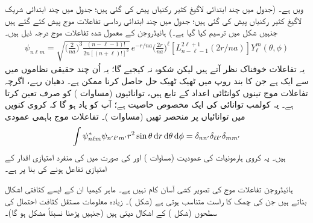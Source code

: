   ویں  ہے۔ (جدول  میں چند ابتدائی لاگیغ  کثیر رکنیاں  پیش کی گئی ہیں؛ جدول  میں چند ابتدائی شریک لاگیغ  کثیر رکنیاں پیش کی  گئی ہیں؛  جدول  میں چند ابتدائی رداسی تفاعلات موج پیش کئے گئے ہیں جنہیں شکل    میں ترسیم کیا گیا ہے۔) ہائیڈروجن کے معمول شدہ تفاعلات موج درجہ ذیل ہیں۔
  \begin{align}\label{مساوات_تین_ابعادی_ہائیڈروجن_تفاعلات_موج}
\psi_{n\ell m}=\sqrt{\big(\frac{2}{na}\big)^3\frac{(n-\ell-1)!}{2n[(n+\ell)!]^{3}}}\,e^{-r/na}\big(\frac{2r}{na}\big)^{\ell}[L_{n-\ell-1}^{2\ell+1}(2r/na)]Y_{\ell}^{m}(\theta,\phi)
\end{align}
یہ تفاعلات خوفناک نظر آتے ہیں لیکن شکوہ  نہ کیجیے گا؛ یہ اُن چند حقیقی نظاموں میں سے ایک ہے جن کا  بند روپ میں ٹھیک ٹھیک حل حاصل کرنا ممکن ہے۔  دھیان رہے، اگرچہ تفاعلات موج تینوں کوانٹائی اعداد کے تابع ہیں، توانائیوں (مساوات ) کو صرف  تعین کرتا ہے۔ یہ کولمب توانائی کی ایک مخصوص خاصیت ہے؛ آپ کو یاد ہو گا کہ کروی کنویں  میں توانائیاں  پر منحصر تھیں (مساوات )۔ تفاعلات موج باہمی عمودی 
\begin{align}
\int\psi_{n\ell m}^{*}\psi_{n'\ell'm'}r^{2}\sin\theta\dif r\dif\theta\dif\phi=\delta_{nn'}\delta_{\ell \ell'}\delta_{mm'} 
\end{align}
ہیں۔ یہ کروی ہارمونیات کی عمودیت (مساوات )  اور  کی صورت میں   کی منفرد امتیازی  اقدار کے امتیازی تفاعل ہونے کی بنا پر ہے۔

ہائیڈروجن تفاعلات موج کی تصویر کشی آسان کام نہیں ہے۔  ماہر کیمیا ان کے ایسے کثافتی اشکال بناتے ہیں جن کی چمک    کا راست متناسب ہوتی ہے (شکل )۔ زیادہ معلومات مستقل کثافت احتمال کی سطحوں (شکل ) کے اشکال دیتی ہیں (جنہیں پڑھنا  نسبتاً مشکل ہو گا)۔


